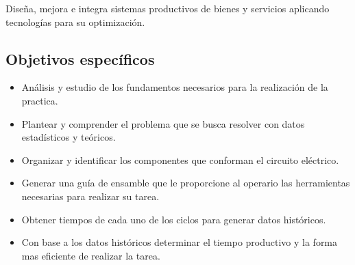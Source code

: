     Diseña, mejora e integra sistemas productivos de bienes y servicios aplicando tecnologías para su optimización.
    
    
    \subsection{Objetivos específicos }
    \begin{itemize}
    \item Análisis y estudio de los fundamentos necesarios para la realización de la practica. 
        \item Plantear y comprender el problema que se busca resolver con datos estadísticos y teóricos. 
        \item Organizar y identificar los componentes que conforman el circuito eléctrico.
        \item Generar una guía de ensamble que le proporcione al operario las herramientas necesarias para realizar su tarea.
        \item Obtener tiempos de cada uno de los ciclos para generar datos históricos.
        \item Con base a los datos históricos determinar el tiempo productivo y la forma mas eficiente de realizar la tarea. 
    \end{itemize}
    
